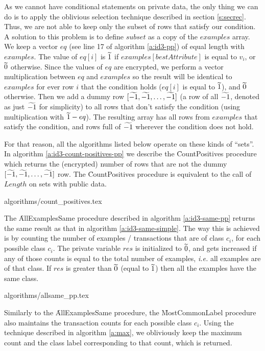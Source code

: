 As we cannot have conditional statements on private data, the only thing we can do is to apply the oblivious selection technique described in section \ref{s:secrec}.
Thus, we are not able to keep only the subset of rows that satisfy our condition.
A solution to this problem is to define $subset$ as a copy of the $examples$ array.
We keep a vector $eq$ (see line 17 of algorithm \ref{a:id3-pp}) of equal length with $examples$.
The value of $eq[i]$ is $\widetilde{1}$ if $examples[bestAttribute]$ is equal to $v_i$, or $\widetilde{0}$ otherwise.
Since the values of $eq$ are encrypted, we perform a vector multiplication between $eq$ and $examples$ so the result will be identical to $examples$ for ever row $i$ that the condition holds ($eq[i]$ is equal to $\widetilde{1}$), and $\widetilde{0}$ otherwise.
Then we add a dummy row $[\widetilde{-1}, \widetilde{-1}, \dots, \widetilde{-1}]$ (a row of all $\widetilde{-1}$, denoted as just $\widetilde{-1}$ for simplicity) to all rows that don't satisfy the condition (using multiplication with $\widetilde{1} - eq$).
The resulting array has all rows from $examples$ that satisfy the condition, and rows full of $\widetilde{-1}$ wherever the condition does not hold.

For that reason, all the algorithms listed below operate on these kinds of ``sets''.
In algorithm \ref{a:id3-count-positives-pp} we describe the \f{CountPositives} procedure which returns the (encrypted) number of rows that are not the dummy $[\widetilde{-1}, \widetilde{-1}, \dots, \widetilde{-1}]$ row.
The \f{CountPositives} procedure is equivalent to the call of $Length$ on sets with public data.


{algorithms/count_positives.tex}

The \f{AllExamplesSame} procedure described in algorithm \ref{a:id3-same-pp} returns the same result as that in algorithm \ref{a:id3-same-simple}.
The way this is achieved is by counting the number of examples / transactions that are of class $c_i$, for each possible class $c_i$.
The private variable $res$ is initialized to $\widetilde{0}$, and gets increased if any of those counts is equal to the total number of examples, \textit{i.e.} all examples are of that class.
If $res$ is greater than $\widetilde{0}$ (equal to $\widetilde{1}$) then all the examples have the same class.

{algorithms/allsame_pp.tex}

Similarly to the \f{AllExamplesSame} procedure, the \f{MostCommonLabel} procedure also maintains the transaction counts for each possible class $c_i$.
Using the technique described in algorithm \ref{a:max}, we obliviously keep the maximum count and the class label corresponding to that count, which is returned.


